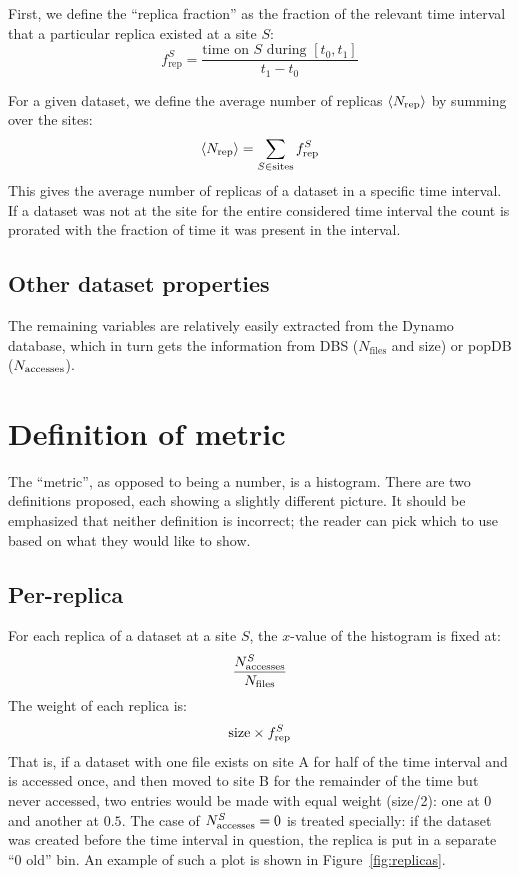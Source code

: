 First, we define the ``replica fraction'' as the fraction of the relevant time
interval that a particular replica existed at a site $S$:
%
\begin{equation}
  f_\textrm{rep}^{S} = \frac{\textrm{time on $S$ during $[t_0,t_1]$}}{t_1 - t_0}
\end{equation}

For a given dataset, we define the average number of replicas $\langle N_\text{rep}\rangle$ by summing over 
the sites:
%
\begin{equation}
  \langle N_\text{rep}\rangle = \sum_{S\in \text{sites}} f_\textrm{rep}^{S}
\end{equation}
%
This gives the average number of replicas of a dataset in a specific time
interval. If a dataset was not at the site for the entire considered time
interval the count is prorated with the fraction of time it was present in the
interval.

\subsection{Other dataset properties}

The remaining variables are relatively easily extracted from the Dynamo database,
which in turn gets the information from DBS ($N_\mathrm{files}$ and size) or popDB
($N_\text{accesses}$).
\section{Definition of metric}

The ``metric'', as opposed to being a number, is a histogram. There are two definitions
proposed, each showing a slightly different picture. It should be emphasized that
neither definition is incorrect; the reader can pick which to use based on what
they would like to show.

\subsection{Per-replica}

For each replica of a dataset at a site $S$, the $x$-value of the histogram is 
fixed at:
%
\begin{equation}
  \frac{N_\text{accesses}^S}{N_\mathrm{files}}
\end{equation}
%
The weight of each replica is:
\begin{equation}
  \mathrm{size} \times f_\text{rep}^S
\end{equation}
That is, if a dataset with one file exists on site A for half of the time interval 
and is accessed once, and then moved to site B for the remainder of the time but 
never accessed, two entries would be made with equal weight (size/2): one at $0$ 
and another at $0.5$. The case of $N_\text{accesses}^S=0$ is treated specially: if the dataset
was created before the time interval in question, the replica is put in a separate
``0 old'' bin.
An example of such a plot is shown in Figure~\ref{fig:replicas}.

